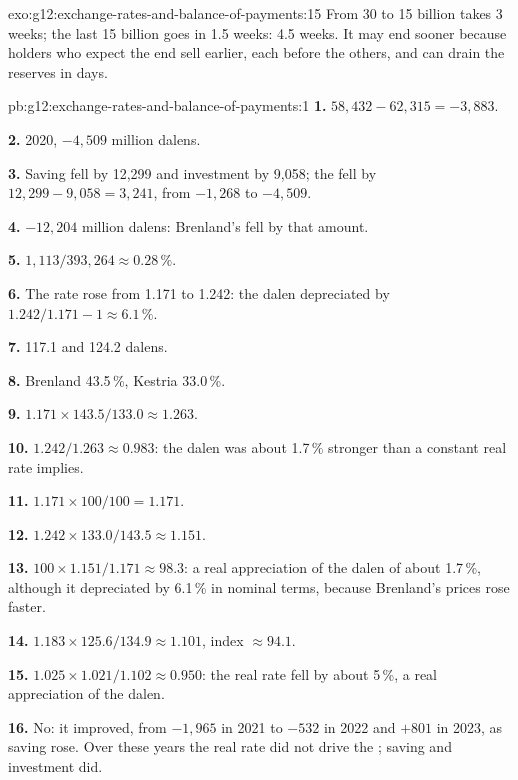 \begin{solution}{exo:g12:exchange-rates-and-balance-of-payments:15}
From 30 to 15 billion takes 3 weeks; the last 15 billion goes in 1.5 weeks: 4.5 weeks. It may end sooner because holders who expect the end sell earlier, each before the
others, and can drain the reserves in days.
\end{solution}

\begin{solution}{pb:g12:exchange-rates-and-balance-of-payments:1}
\textbf{1.} $58{,}432 - 62{,}315 = -3{,}883$.

\textbf{2.} 2020, $-4{,}509$ million dalens.

\textbf{3.} Saving fell by 12,299 and investment by 9,058; the  fell by $12{,}299 - 9{,}058 = 3{,}241$, from $-1{,}268$ to $-4{,}509$.

\textbf{4.} $-12{,}204$ million dalens: Brenland's  fell by that amount.

\textbf{5.} $1{,}113/393{,}264 \approx 0.28\,\%$.

\textbf{6.} The rate rose from 1.171 to 1.242: the dalen depreciated by $1.242/1.171 - 1 \approx 6.1\,\%$.

\textbf{7.} 117.1 and 124.2 dalens.

\textbf{8.} Brenland 43.5\,\%, Kestria 33.0\,\%.

\textbf{9.} $1.171 \times 143.5/133.0 \approx 1.263$.

\textbf{10.} $1.242/1.263 \approx 0.983$: the dalen was about 1.7\,\% stronger than a constant real rate implies.

\textbf{11.} $1.171 \times 100/100 = 1.171$.

\textbf{12.} $1.242 \times 133.0/143.5 \approx 1.151$.

\textbf{13.} $100 \times 1.151/1.171 \approx 98.3$: a real appreciation of the dalen of about 1.7\,\%, although it depreciated by 6.1\,\% in nominal terms, because Brenland's prices
rose faster.

\textbf{14.} $1.183 \times 125.6/134.9 \approx 1.101$, index $\approx 94.1$.

\textbf{15.} $1.025 \times 1.021/1.102 \approx 0.950$: the real rate fell by about 5\,\%, a real appreciation of the dalen.

\textbf{16.} No: it improved, from $-1{,}965$ in 2021 to $-532$ in 2022 and $+801$ in 2023, as saving rose. Over these years the real rate did not drive the ;
saving and investment did.


\end{solution}
